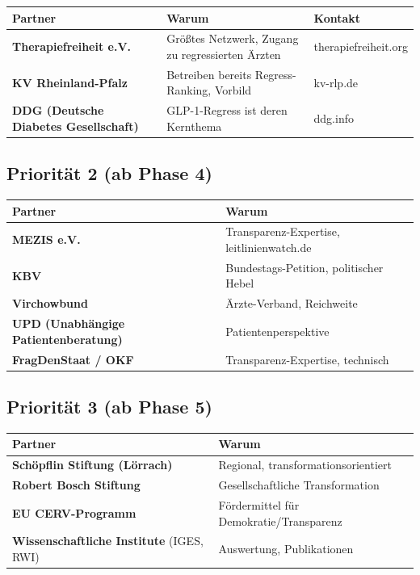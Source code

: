 \documentclass{umbruch-position}
\begin{document}
{\small
\begin{tabularx}{\textwidth}{X X X}
\toprule
\textbf{Partner} & \textbf{Warum} & \textbf{Kontakt} \\
\midrule
\textbf{Therapiefreiheit e.V.} & Größtes Netzwerk, Zugang zu regressierten Ärzten & therapiefreiheit.org \\
\textbf{KV Rheinland-Pfalz} & Betreiben bereits Regress-Ranking, Vorbild & kv-rlp.de \\
\textbf{DDG (Deutsche Diabetes Gesellschaft)} & GLP-1-Regress ist deren Kernthema & ddg.info \\
\bottomrule
\end{tabularx}
}


\subsection{Priorität 2 (ab Phase 4)}

{\small
\begin{tabularx}{\textwidth}{X X}
\toprule
\textbf{Partner} & \textbf{Warum} \\
\midrule
\textbf{MEZIS e.V.} & Transparenz-Expertise, leitlinienwatch.de \\
\textbf{KBV} & Bundestags-Petition, politischer Hebel \\
\textbf{Virchowbund} & Ärzte-Verband, Reichweite \\
\textbf{UPD (Unabhängige Patientenberatung)} & Patientenperspektive \\
\textbf{FragDenStaat / OKF} & Transparenz-Expertise, technisch \\
\bottomrule
\end{tabularx}
}


\subsection{Priorität 3 (ab Phase 5)}

{\small
\begin{tabularx}{\textwidth}{X X}
\toprule
\textbf{Partner} & \textbf{Warum} \\
\midrule
\textbf{Schöpflin Stiftung (Lörrach)} & Regional, transformationsorientiert \\
\textbf{Robert Bosch Stiftung} & Gesellschaftliche Transformation \\
\textbf{EU CERV-Programm} & Fördermittel für Demokratie/Transparenz \\
\textbf{Wissenschaftliche Institute} (IGES, RWI) & Auswertung, Publikationen \\
\bottomrule
\end{tabularx}
}
\end{document}
